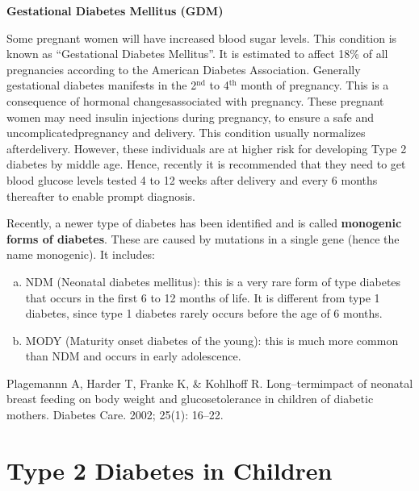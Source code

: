 \noindent
\textbf{Gestational Diabetes Mellitus (GDM)}

Some pregnant women will have increased blood sugar levels. This condition is known as “Gestational Diabetes Mellitus”. It is estimated to affect 18\% of all pregnancies according to the American Diabetes Association. Generally gestational diabetes manifests in the 2$^{\text{nd}}$ to 4$^{\text{th}}$ month of pregnancy. This is a consequence of hormonal changes\break associated with pregnancy. These pregnant women may need insulin injections during pregnancy, to ensure a safe and uncomplicated\break pregnancy and delivery. This condition usually normalizes after\break delivery. However, these individuals are at higher risk for deve\-loping Type 2 diabetes by middle age. Hence, recently it is recommended that they need to get blood glucose levels tested 4 to 12 weeks after delivery and every 6 months thereafter to enable prompt diagnosis.

Recently, a newer type of diabetes has been identified and is called \textbf{monogenic forms of diabetes}. These are caused by mutations in a single gene (hence the name monogenic). It includes:

\vspace{-\topsep}
\begin{enumerate}[a.]
\itemsep=0pt
\item NDM (Neonatal diabetes mellitus): this is a very rare form of type diabetes that occurs in the first 6 to 12 months of life. It is different from type 1 diabetes, since type 1 diabetes rarely occurs before the age of 6 months.
\item MODY (Maturity onset diabetes of the young): this is much more common than NDM and occurs in early adolescence.
\end{enumerate}
\vspace{-\topsep}

\begin{thebibliography}{99}
 Plagemannn A, Harder T, Franke K, \& Kohlhoff R. Long–term\break impact of neonatal breast feeding on body weight and glucose\break tolerance in children of diabetic mothers. Diabetes Care. 2002; 25(1): 16–22.
\end{thebibliography}

\newpage

\chapter{Type 2 Diabetes in Children}\label{chap7}

